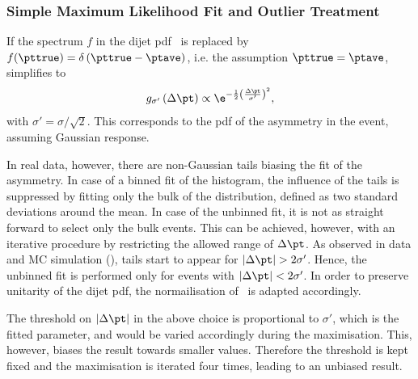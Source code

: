 \subsubsection{Simple Maximum Likelihood Fit and Outlier Treatment}\label{sec:ResFit:Asym:SimpleFit}

If the spectrum $f$ in the dijet pdf~ is replaced by \mbox{$f(\pttrue)  = \delta\left(\pttrue - \ptave\right)$}, i.e. the assumption \mbox{$\pttrue = \ptave$}, 
 simplifies to
\begin{equation}
\label{eq:ResFit::DijetPdfTransformed:Simple}
  g_{\sigma'}\left(\Delta\pt\right) \propto
  \e^{-\frac{1}{2}\left(\frac{\Delta\pt}{\sigma'}\right)^{2}}, 
\end{equation}
with \mbox{$\sigma' = \sigma/\sqrt{2}$}.
This corresponds to the pdf of the asymmetry in the event, assuming
Gaussian response.

In real data, however, there are non-Gaussian tails biasing the fit of the asymmetry.
In case of a binned fit of the histogram, the influence of the tails is suppressed by
fitting only the bulk of the distribution, defined as two standard deviations around the mean.
In case of the unbinned fit, it is not as straight
forward to select only the bulk events.
This can be achieved, however, with an iterative procedure by restricting
the allowed range of $\Delta\pt$.
As observed in data and MC simulation (), tails start to appear for \mbox{$|\Delta\pt| > 2\sigma'$}.
Hence, the unbinned fit is performed only for events with \mbox{$|\Delta\pt| < 2\sigma'$}.
In order to preserve unitarity of the dijet pdf, the normailisation
of~ is adapted accordingly.

The threshold on $|\Delta\pt|$ in the above choice is proportional to $\sigma'$, which is the fitted parameter, and would be varied accordingly during the maximisation.
This, however, biases the result towards smaller  values.
Therefore the threshold is kept fixed and the maximisation is iterated
four times, leading to an unbiased result.

